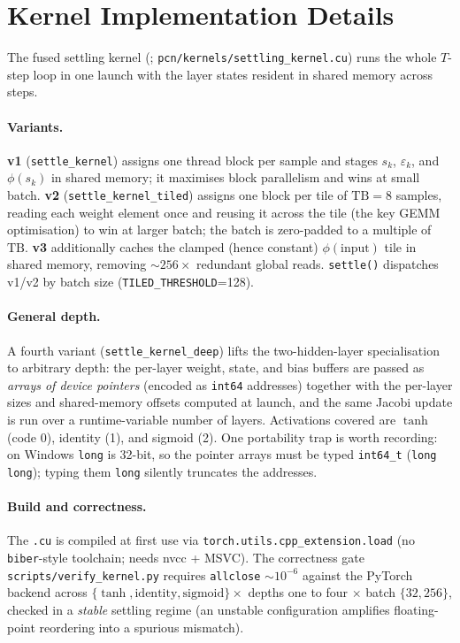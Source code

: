 \section{Kernel Implementation Details}\label{app:kernel}

The fused settling kernel (; \texttt{pcn/kernels/settling\_kernel.cu}) runs the
whole $T$-step loop in one launch with the layer states resident in shared memory across steps.

\paragraph{Variants.} \textbf{v1} (\texttt{settle\_kernel}) assigns one thread block per sample and
stages $s_k$, $\varepsilon_k$, and $\phi(s_k)$ in shared memory; it maximises block parallelism and
wins at small batch. \textbf{v2} (\texttt{settle\_kernel\_tiled}) assigns one block per tile of
$\mathrm{TB}=8$ samples, reading each weight element once and reusing it across the tile (the key
GEMM optimisation) to win at larger batch; the batch is zero-padded to a multiple of $\mathrm{TB}$.
\textbf{v3} additionally caches the clamped (hence constant) $\phi(\text{input})$ tile in shared
memory, removing $\sim\!256\times$ redundant global reads. \texttt{settle()} dispatches v1/v2 by
batch size (\texttt{TILED\_THRESHOLD}=128).

\paragraph{General depth.} A fourth variant (\texttt{settle\_kernel\_deep}) lifts the
two-hidden-layer specialisation to arbitrary depth: the per-layer weight, state, and bias buffers
are passed as \emph{arrays of device pointers} (encoded as \texttt{int64} addresses) together with
the per-layer sizes and shared-memory offsets computed at launch, and the same Jacobi update is run
over a runtime-variable number of layers. Activations covered are $\tanh$ (code 0), identity (1),
and sigmoid (2). One portability trap is worth recording: on Windows \texttt{long} is 32-bit, so the
pointer arrays must be typed \texttt{int64\_t} (\texttt{long long}); typing them \texttt{long}
silently truncates the addresses.

\paragraph{Build and correctness.} The \texttt{.cu} is compiled at first use via
\texttt{torch.utils.cpp\_extension.load} (no \texttt{biber}-style toolchain; needs nvcc + MSVC). The
correctness gate \texttt{scripts/verify\_kernel.py} requires \texttt{allclose} $\sim\!10^{-6}$
against the PyTorch backend across $\{\tanh,\text{identity},\text{sigmoid}\}\times$ depths one to
four $\times$ batch $\{32,256\}$, checked in a \emph{stable} settling regime (an unstable
configuration amplifies floating-point reordering into a spurious mismatch).

